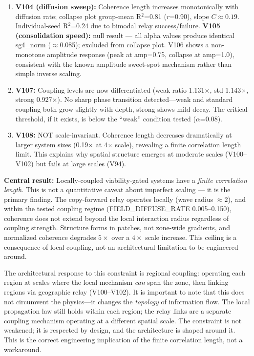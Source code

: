 \documentclass[11pt]{article}
\begin{document}
\begin{enumerate}
  \item \textbf{V104 (diffusion sweep):} Coherence length increases monotonically with diffusion rate; collapse plot group-mean R$^2$=0.81 ($r$=0.90), slope $C \approx 0.19$. Individual-seed R$^2$=0.24 due to bimodal relay success/failure. \textbf{V105 (consolidation speed):} null result --- all alpha values produce identical sg4\_norm ($\approx$0.085); excluded from collapse plot. V106 shows a non-monotone amplitude response (peak at amp=0.75, collapse at amp=1.0), consistent with the known amplitude sweet-spot mechanism rather than simple inverse scaling.

  \item \textbf{V107:} Coupling levels are now differentiated (weak ratio 1.131×, std 1.143×, strong 0.927×). No sharp phase transition detected---weak and standard coupling both grow slightly with depth, strong shows mild decay. The critical threshold, if it exists, is below the ``weak'' condition tested ($\alpha$=0.08).

  \item \textbf{V108:} NOT scale-invariant. Coherence length decreases dramatically at larger system sizes (0.19× at 4× scale), revealing a finite correlation length limit. This explains why spatial structure emerges at moderate scales (V100--V102) but fails at large scales (V94).
\end{enumerate}

\textbf{Central result:} Locally-coupled viability-gated systems have a \emph{finite correlation length}. This is not a quantitative caveat about imperfect scaling --- it is the primary finding. The copy-forward relay operates locally (wave radius $\approx 2$), and within the tested coupling regime (FIELD\_DIFFUSE\_RATE 0.005--0.150), coherence does not extend beyond the local interaction radius regardless of coupling strength. Structure forms in patches, not zone-wide gradients, and normalized coherence degrades $5\times$ over a $4\times$ scale increase. This ceiling is a consequence of local coupling, not an architectural limitation to be engineered around.

The architectural response to this constraint is regional coupling: operating each region at scales where the local mechanism \emph{can} span the zone, then linking regions via geographic relay (V100--V102). It is important to note that this does not circumvent the physics---it changes the \emph{topology} of information flow. The local propagation law still holds within each region; the relay links are a separate coupling mechanism operating at a different spatial scale. The constraint is not weakened; it is respected by design, and the architecture is shaped around it. This is the correct engineering implication of the finite correlation length, not a workaround.
\end{document}
